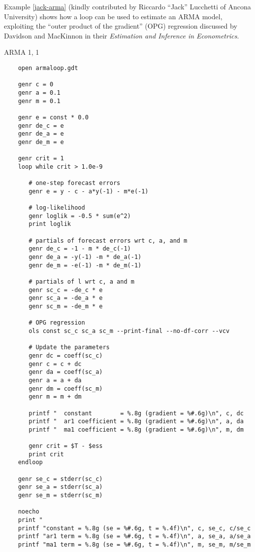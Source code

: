 Example \ref{jack-arma} (kindly contributed by
	Riccardo ``Jack'' Lucchetti of Ancona University)
	shows how a loop can be used to estimate an ARMA model,
	exploiting the ``outer product of the gradient''
	(OPG) regression discussed by Davidson and MacKinnon in their
	\emph{Estimation and Inference in
	  Econometrics}.

\begin{script}[htbp]
\caption{ARMA 1, 1}
\label{jack-arma}

\begin{verbatim}
	open armaloop.gdt

	genr c = 0
	genr a = 0.1
	genr m = 0.1

	genr e = const * 0.0
	genr de_c = e
	genr de_a = e
	genr de_m = e

	genr crit = 1
	loop while crit > 1.0e-9

	   # one-step forecast errors
	   genr e = y - c - a*y(-1) - m*e(-1)  

	   # log-likelihood 
	   genr loglik = -0.5 * sum(e^2)
	   print loglik

	   # partials of forecast errors wrt c, a, and m
	   genr de_c = -1 - m * de_c(-1) 
	   genr de_a = -y(-1) -m * de_a(-1)
	   genr de_m = -e(-1) -m * de_m(-1)
   
	   # partials of l wrt c, a and m
	   genr sc_c = -de_c * e
	   genr sc_a = -de_a * e
	   genr sc_m = -de_m * e
   
	   # OPG regression
	   ols const sc_c sc_a sc_m --print-final --no-df-corr --vcv

	   # Update the parameters
	   genr dc = coeff(sc_c) 
	   genr c = c + dc
	   genr da = coeff(sc_a) 
	   genr a = a + da
	   genr dm = coeff(sc_m) 
	   genr m = m + dm

	   printf "  constant        = %.8g (gradient = %#.6g)\n", c, dc
	   printf "  ar1 coefficient = %.8g (gradient = %#.6g)\n", a, da
	   printf "  ma1 coefficient = %.8g (gradient = %#.6g)\n", m, dm

	   genr crit = $T - $ess
	   print crit
	endloop

	genr se_c = stderr(sc_c)
	genr se_a = stderr(sc_a)
	genr se_m = stderr(sc_m)

	noecho
	print "
	printf "constant = %.8g (se = %#.6g, t = %.4f)\n", c, se_c, c/se_c
	printf "ar1 term = %.8g (se = %#.6g, t = %.4f)\n", a, se_a, a/se_a
	printf "ma1 term = %.8g (se = %#.6g, t = %.4f)\n", m, se_m, m/se_m
	\end{verbatim}
\end{script}



